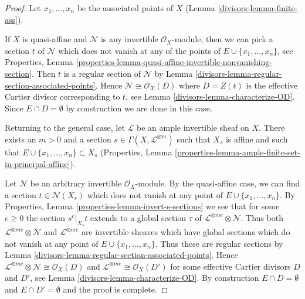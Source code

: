 \begin{proof}

Let $x_1, \ldots, x_n$ be the associated points of $X$
(Lemma \ref{divisors-lemma-finite-ass}).

\medskip\noindent
If $X$ is quasi-affine and $\mathcal{N}$ is any invertible
$\mathcal{O}_X$-module, then we can pick a section $t$ of
$\mathcal{N}$ which does not vanish at any of the points
of $E \cup \{x_1, \ldots, x_n\}$, see Properties, Lemma
\ref{properties-lemma-quasi-affine-invertible-nonvanishing-section}.
Then $t$ is a regular section of $\mathcal{N}$ by
Lemma \ref{divisors-lemma-regular-section-associated-points}.
Hence $\mathcal{N} \cong \mathcal{O}_X(D)$ where
$D = Z(t)$ is the effective Cartier divisor corresponding to $t$, see
Lemma \ref{divisors-lemma-characterize-OD}. Since $E \cap D = \emptyset$
by construction we are done in this case.

\medskip\noindent
Returning to the general case, let $\mathcal{L}$ be an ample invertible sheaf
on $X$. There exists an $m > 0$ and a section
$s \in \Gamma(X, \mathcal{L}^{\otimes m})$ such that $X_s$
is affine and such that $E \cup \{x_1, \ldots, x_n\} \subset X_s$
(Properties, Lemma \ref{properties-lemma-ample-finite-set-in-principal-affine}).

\medskip\noindent
Let $\mathcal{N}$ be an arbitrary invertible $\mathcal{O}_X$-module.
By the quasi-affine case, we can find a section
$t \in \mathcal{N}(X_s)$ which does not vanish at any point
of $E \cup \{x_1, \ldots, x_n\}$.
By Properties, Lemma \ref{properties-lemma-invert-s-sections}
we see that for some $e \geq 0$ the section $s^e|_{X_s} t$ extends to
a global section $\tau$ of $\mathcal{L}^{\otimes me} \otimes \mathcal{N}$.
Thus both $\mathcal{L}^{\otimes me} \otimes \mathcal{N}$ and
$\mathcal{L}^{\otimes me}$ are invertible sheaves which have global sections
which do not vanish at any point of $E \cup \{x_1, \ldots, x_n\}$.
Thus these are regular sections by
Lemma \ref{divisors-lemma-regular-section-associated-points}.
Hence $\mathcal{L}^{\otimes me} \otimes \mathcal{N} \cong \mathcal{O}_X(D)$
and $\mathcal{L}^{\otimes me} \cong \mathcal{O}_X(D')$ for some
effective Cartier divisors $D$ and $D'$, see Lemma \ref{divisors-lemma-characterize-OD}.
By construction $E \cap D = \emptyset$ and $E \cap D' = \emptyset$
and the proof is complete.
\end{proof}

